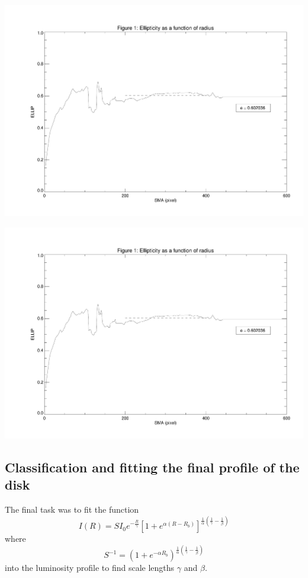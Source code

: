 \documentclass[a4paper,12pt]{article}
\begin{document}
\centerline{\includegraphics[scale=0.6,page=3]{ellipticity.pdf}}%

\centerline{\includegraphics[scale=0.6,page=4]{ellipticity.pdf}}%

\subsection{Classification and fitting the final profile of the disk}

The final task was to fit the function
\begin{equation*}
I(R) = S I_0 e^{-\frac{R}{\gamma}} \left[ 1+e^{\alpha (R-R_b)} \right]^{\frac{1}{\alpha}\left(\frac{1}{\gamma}-\frac{1}{\beta}\right)}
\end{equation*}
where
\begin{equation*}
S^{-1}=\left(1+e^{-\alpha R_b}\right)^{\frac{1}{\alpha}\left(\frac{1}{\gamma}-\frac{1}{\beta}\right)}
\end{equation*}
into the luminosity profile to find scale lengths $\gamma$ and $\beta$. 
\end{document}

